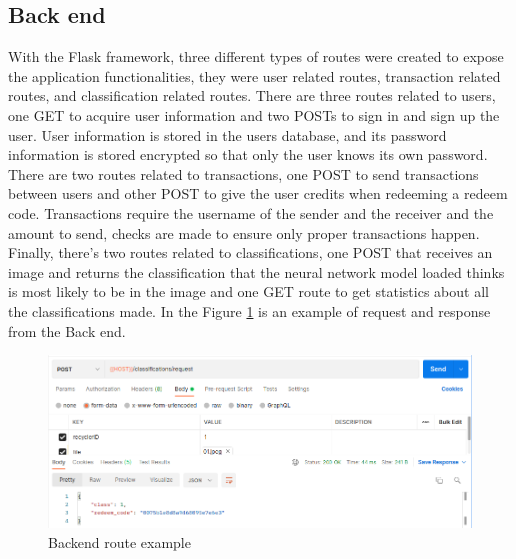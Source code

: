 \documentclass[a4paper,11pt]{article}
\begin{document}
\subsection{Back end}
With the Flask framework, three different types of routes were created to expose the application functionalities, they were user related routes, transaction related routes, and classification related routes.
There are three routes related to users, one GET to acquire user information and two POSTs to sign in and sign up the user. User information is stored in the users database, and its password information is stored encrypted so that only the user knows its own password.
There are two routes related to transactions, one POST to send transactions between users and other POST to give the user credits when redeeming a redeem code. Transactions require the username of the sender and the receiver and the amount to send, checks are made to ensure only proper transactions happen.
Finally, there’s two routes related to classifications, one POST that receives an image and returns the classification that the neural network model loaded thinks is most likely to be in the image and one GET route to get statistics about all the classifications made.
In the Figure \ref{fig:backend_route} is an example of request and response from the Back end.

\begin{figure}[H]
  \centering
  \includegraphics[width=12.5cm]{Figures/backend_classification_request.png}
  \caption{\small{Backend route example}}
  \label{fig:backend_route}
\end{figure}
\end{document}
